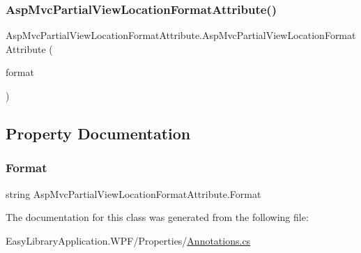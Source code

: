 \subsubsection{\texorpdfstring{Asp\+Mvc\+Partial\+View\+Location\+Format\+Attribute()}{AspMvcPartialViewLocationFormatAttribute()}}
{\footnotesize\ttfamily Asp\+Mvc\+Partial\+View\+Location\+Format\+Attribute.\+Asp\+Mvc\+Partial\+View\+Location\+Format\+Attribute (\begin{DoxyParamCaption}\item[{\mbox{[}\+Not\+Null\mbox{]} string}]{format }\end{DoxyParamCaption})}



\subsection{Property Documentation}
\mbox{\label{class_asp_mvc_partial_view_location_format_attribute_ab75cab80e0a441e206eadb7adce25efd}} 
\subsubsection{\texorpdfstring{Format}{Format}}
{\footnotesize\ttfamily string Asp\+Mvc\+Partial\+View\+Location\+Format\+Attribute.\+Format\hspace{0.3cm}{\ttfamily [get]}}



The documentation for this class was generated from the following file\+:\begin{DoxyCompactItemize}
\item 
Easy\+Library\+Application.\+W\+P\+F/\+Properties/\mbox{\hyperlink{_annotations_8cs}{Annotations.\+cs}}\end{DoxyCompactItemize}
